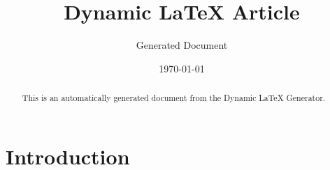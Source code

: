 \documentclass[12pt]{article}
\title{Dynamic LaTeX Article}
\author{Generated Document}
\date{\today}
\begin{document}
\maketitle

\begin{abstract}
This is an automatically generated document from the Dynamic LaTeX Generator.
\end{abstract}

\section*{Introduction}

\end{document}
